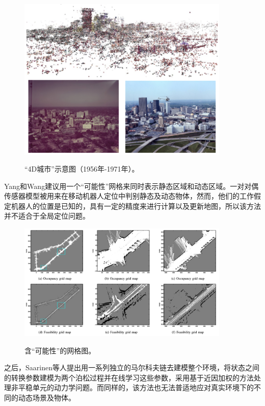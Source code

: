 \begin{figure}[htbp]
	\centering
	\includegraphics[width=0.9\textwidth]{figs/2-3/city.png}
	\label{fig: 4D city}
	\caption{“4D城市”示意图（1956年-1971年）。}
\end{figure}

Yang和Wang\cite{Yang2011Feasibility}建议用一个“可能性”网格来同时表示静态区域和动态区域。一对对偶传感器模型被用来在移动机器人定位中判别静态及动态物体，然而，他们的工作假定机器人的位置是已知的，具有一定的精度来进行计算以及更新地图，所以该方法并不适合于全局定位问题。

\begin{figure}[htbp]
	\centering
	\includegraphics[width=0.9\textwidth]{figs/2-3/feasible.png}
	\label{fig: Grid maps}
	\caption{含“可能性”的网格图。}
\end{figure}

之后，Saarinen\cite{Saarinen2012Independent}等人提出用一系列独立的马尔科夫链去建模整个环境，将状态之间的转换参数建模为两个泊松过程并在线学习这些参数，采用基于近因加权的方法处理非平稳单元的动力学问题。而同样的，该方法也无法普适地应对真实环境下的不同的动态场景及物体。

